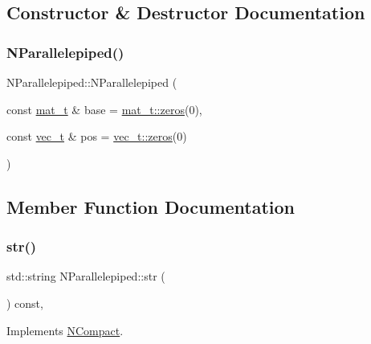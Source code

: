 \subsection{Constructor \& Destructor Documentation}
\mbox{\label{class_n_parallelepiped_af80601a4fc3edfeca3e7f1209cc2b704}} 
\subsubsection{\texorpdfstring{NParallelepiped()}{NParallelepiped()}}
{\footnotesize\ttfamily N\+Parallelepiped\+::\+N\+Parallelepiped (\begin{DoxyParamCaption}\item[{const \mbox{\hyperlink{_n_p_matrix_8h_a44dfb60c1e03b44e98a332fb2ae71947}{mat\+\_\+t}} \&}]{base = {\ttfamily \mbox{\hyperlink{class_n_p_matrix_a701c8f60b4b8b727fccb063cd6f0784b}{mat\+\_\+t\+::zeros}}(0)},  }\item[{const \mbox{\hyperlink{group___n_algebra_ga0a2cfc67e738a3d73e4f12098c4c07f6}{vec\+\_\+t}} \&}]{pos = {\ttfamily \mbox{\hyperlink{class_n_vector_a6253cef3c39dd9d388bbf7d17069bc51}{vec\+\_\+t\+::zeros}}(0)} }\end{DoxyParamCaption})}



\subsection{Member Function Documentation}
\mbox{\label{class_n_parallelepiped_a2f5b58b9b80e9b3fda4177fb7703b221}} 
\subsubsection{\texorpdfstring{str()}{str()}}
{\footnotesize\ttfamily std\+::string N\+Parallelepiped\+::str (\begin{DoxyParamCaption}{ }\end{DoxyParamCaption}) const\hspace{0.3cm}{\ttfamily [override]}, {\ttfamily [virtual]}}



Implements \mbox{\hyperlink{class_n_compact_af1879d7342bf6d9902ed5473f6e89038}{N\+Compact}}.

